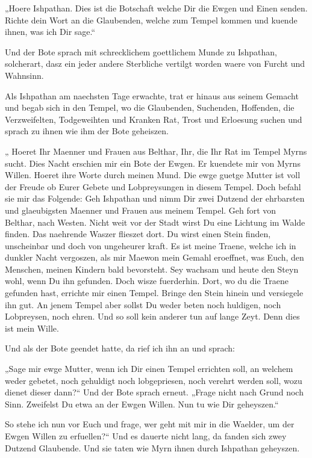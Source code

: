 \documentclass[a5paper,8pt]{book}
\begin{document}
„Hoere Ishpathan. Dies ist die Botschaft welche Dir die Ewgen und Einen senden. Richte dein Wort an die Glaubenden, welche zum Tempel kommen und kuende ihnen, was ich Dir sage.“

Und der Bote sprach mit schrecklichem goettlichem Munde zu Ishpathan, solcherart, dasz ein jeder andere Sterbliche vertilgt worden waere von Furcht und Wahnsinn.

Als Ishpathan am naechsten Tage erwachte, trat er hinaus aus seinem Gemacht und begab sich in den Tempel, wo die Glaubenden, Suchenden, Hoffenden, die Verzweifelten, Todgeweihten und Kranken Rat, Trost und Erloesung suchen und sprach zu ihnen wie ihm der Bote geheiszen.

„ Hoeret Ihr Maenner und Frauen aus Belthar, Ihr, die Ihr Rat im Tempel Myrns sucht. Dies Nacht erschien mir ein Bote der Ewgen. Er kuendete mir von Myrns Willen. Hoeret ihre Worte durch meinen Mund. Die ewge guetge Mutter ist voll der Freude ob Eurer Gebete und Lobpreysungen in diesem Tempel. Doch befahl sie mir das Folgende: Geh Ishpathan und nimm Dir zwei Dutzend der ehrbarsten und glaeubigsten Maenner und Frauen aus meinem Tempel. Geh fort von Belthar, nach Westen. Nicht weit vor der Stadt wirst Du eine Lichtung im Walde finden. Das naehrende Waszer flieszet dort. Du wirst einen Stein finden, unscheinbar und doch von ungeheurer kraft. Es ist meine Traene, welche ich in dunkler Nacht vergoszen, als mir Maewon mein Gemahl eroeffnet, was Euch, den Menschen, meinen Kindern bald bevorsteht. Sey wachsam und heute den Steyn wohl, wenn Du ihn gefunden. Doch wisze fuerderhin. Dort, wo du die Traene gefunden hast, errichte mir einen Tempel. Bringe den Stein hinein und versiegele ihn gut. An jenem Tempel aber 
sollst Du weder beten noch huldigen, noch Lobpreysen, noch ehren. Und so soll kein anderer tun auf lange Zeyt. Denn dies ist mein Wille. 

Und als der Bote geendet hatte, da rief ich ihn an und sprach:

„Sage mir ewge Mutter, wenn ich Dir einen Tempel errichten soll, an welchem weder gebetet, noch gehuldigt noch lobgepriesen, noch verehrt werden soll, wozu dienet dieser dann?“
Und der Bote sprach erneut.
„Frage nicht nach Grund noch Sinn. Zweifelst Du etwa an der Ewgen Willen. Nun tu wie Dir geheyszen.“

So stehe ich nun vor Euch und frage, wer geht mit mir in die Waelder, um der Ewgen Willen zu erfuellen?“
Und es dauerte nicht lang, da fanden sich zwey Dutzend Glaubende. Und sie taten wie Myrn ihnen durch Ishpathan geheyszen.
\end{document}
